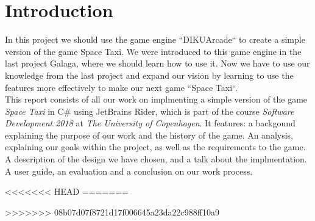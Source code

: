 \documentclass[../master.tex]{subfile}
\begin{document}
\section{Introduction}
In this project we should use the game engine ``DIKUArcade`` to create a simple version of the game Space Taxi. We were introduced to this game engine in the last project Galaga, where we should learn how to use it. Now we have to use our knowledge from the last project and expand our vision by learning to use the features more effectively to make our next game ``Space Taxi``.\\

This report consists of all our work on implmenting a simple version of the game \textit{Space Taxi} in C\# using JetBrains Rider, which is part of the course \textit{Software Development 2018} at \textit{The University of Copenhagen}. It features: a backgound explaining the purpose of our work and the history of the game. An analysis, explaining our goals within the project, as well as the requirements to the game. A description of the design we have chosen, and a talk about the implmentation. A user guide, an evaluation and a conclusion on our work process.

<<<<<<< HEAD
=======

>>>>>>> 08b07d07f8721d17f006645a23da22c988ff10a9
\end{document}
